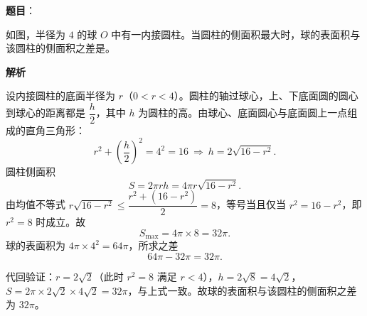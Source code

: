 \begin{answer}

\textbf{题目}：

如图，半径为 $4$ 的球 $O$ 中有一内接圆柱。当圆柱的侧面积最大时，球的表面积与该圆柱的侧面积之差是\gkblank{}。
\nopagebreak[4]
\begin{center}\end{center}
\nopagebreak[4]
\textbf{解析}

设内接圆柱的底面半径为 $r$（$0<r<4$）。圆柱的轴过球心，上、下底面圆的圆心到球心的距离都是 $\dfrac h2$，其中 $h$ 为圆柱的高。由球心、底面圆心与底面圆上一点组成的直角三角形：
\nopagebreak[4]
\[
r^2+\left(\frac h2\right)^2=4^2=16\ \Longrightarrow\ h=2\sqrt{16-r^2}.
\]
圆柱侧面积
\nopagebreak[4]
\[
S=2\pi rh=4\pi r\sqrt{16-r^2}.
\]
由均值不等式 $r\sqrt{16-r^2}\leqslant\dfrac{r^2+(16-r^2)}{2}=8$，等号当且仅当 $r^2=16-r^2$，即 $r^2=8$ 时成立。故
\nopagebreak[4]
\[
S_{\max}=4\pi\times8=32\pi.
\]
球的表面积为 $4\pi\times4^2=64\pi$，所求之差
\nopagebreak[4]
\[
64\pi-32\pi=32\pi.
\]

代回验证：$r=2\sqrt2$（此时 $r^2=8$ 满足 $r<4$），$h=2\sqrt8=4\sqrt2$，$S=2\pi\times2\sqrt2\times4\sqrt2=32\pi$，与上式一致。故球的表面积与该圆柱的侧面积之差为 $32\pi$。


\end{answer}
